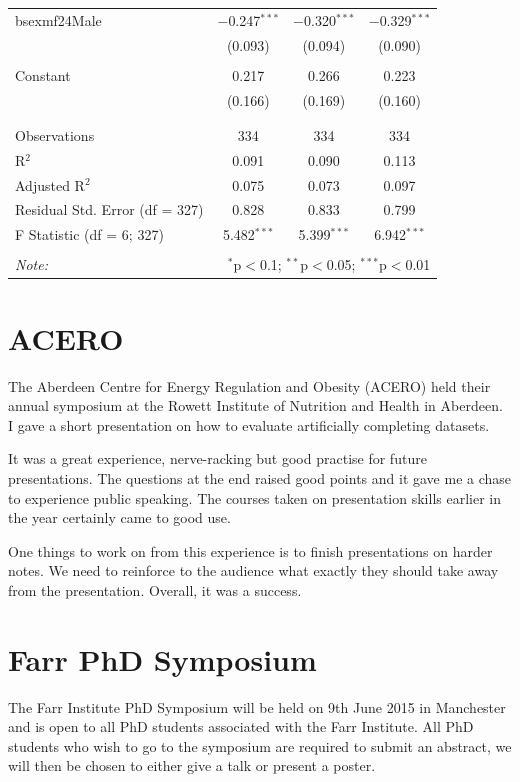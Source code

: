 \documentclass[bsc]{abdnthesis}
\begin{document}
\begin{table}[H]
\begin{tabular}{@{\extracolsep{5pt}}lccc}
 bsexmf24Male & $-$0.247$^{***}$ & $-$0.320$^{***}$ & $-$0.329$^{***}$ \\ 
  & (0.093)  & (0.094) & (0.090) \\ 
  & & & \\ 
 Constant & 0.217 & 0.266 & 0.223 \\ 
  & (0.166) & (0.169) & (0.160) \\ 
  & & & \\ 
\hline \\[-1.8ex] 
Observations & 334 & 334 & 334 \\ 
R$^{2}$ & 0.091 & 0.090 & 0.113 \\ 
Adjusted R$^{2}$ & 0.075 & 0.073 & 0.097 \\ 
Residual Std. Error (df = 327) & 0.828 & 0.833 & 0.799 \\ 
F Statistic (df = 6; 327) & 5.482$^{***}$ & 5.399$^{***}$ & 6.942$^{***}$ \\ 
\hline 
\hline \\[-1.8ex] 
\textit{Note:}  & \multicolumn{3}{r}{$^{*}$p$<$0.1; $^{**}$p$<$0.05; $^{***}$p$<$0.01} \\ 
\end{tabular} 
\end{table} 


\section{ACERO} %
\label{sec:acero}
The Aberdeen Centre for Energy Regulation and Obesity (ACERO) held their annual symposium at the Rowett Institute of Nutrition and Health in Aberdeen\cite{ acero}. I gave a short presentation on how to evaluate artificially completing datasets. 

It was a great experience, nerve-racking but good practise for future presentations. The questions at the end raised good points and it gave me a chase to experience public speaking. The courses taken on presentation skills earlier in the year certainly came to good use. 

One things to work on from this experience is to finish presentations on harder notes. We need to reinforce to the audience what exactly they should take away from the presentation. Overall, it was a success.
\section{Farr PhD Symposium} %
\label{sec:farr_phd_symposium}
The Farr Institute PhD Symposium will be held on 9th June 2015 in Manchester\cite{ farr-phd} and is open to all PhD students associated with the Farr Institute. All PhD students who wish to go to the symposium are required to submit an abstract, we will then be chosen to either give a talk or present a poster. 
\end{document}
